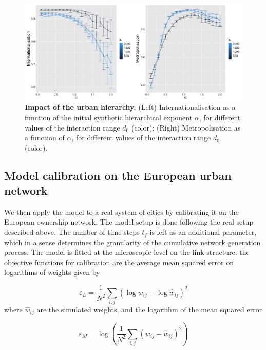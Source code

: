 \documentclass[10pt,letterpaper]{article}
\begin{document}
\begin{figure}
    \begin{center}
        \includegraphics[width=\linewidth]{figures/Fig7.png}
    \end{center}
    \vspace{2cm}
    \caption{\textbf{Impact of the urban hierarchy.} (Left) Internationalisation as a function of the initial synthetic hierarchical exponent $\alpha$, for different values of the interaction range $d_0$ (color); (Right) Metropolisation as a function of $\alpha$, for different values of the interaction range $d_0$ (color).\label{fig:fig7}}
\end{figure}



\subsection*{Model calibration on the European urban network}

We then apply the model to a real system of cities by calibrating it on the European ownership network. The model setup is done following the real setup described above. The number of time steps $t_f$ is left as an additional parameter, which in a sense determines the granularity of the cumulative network generation process. The model is fitted at the microscopic level on the link structure: the objective functions for calibration are the average mean squared error on logarithms of weights given by

\begin{equation}
\varepsilon_L = \frac{1}{N^2} \sum_{i,j} \left(\log w_{ij} - \log \hat{w}_{ij} \right)^2
\end{equation}
where $\hat{w}_{ij}$ are the simulated weights, and the logarithm of the mean squared error

\begin{equation}
\varepsilon_M = \log\left(\frac{1}{N^2} \sum_{i,j} \left(w_{ij} - \hat{w}_{ij}\right)^2 \right)
\end{equation}
\end{document}
